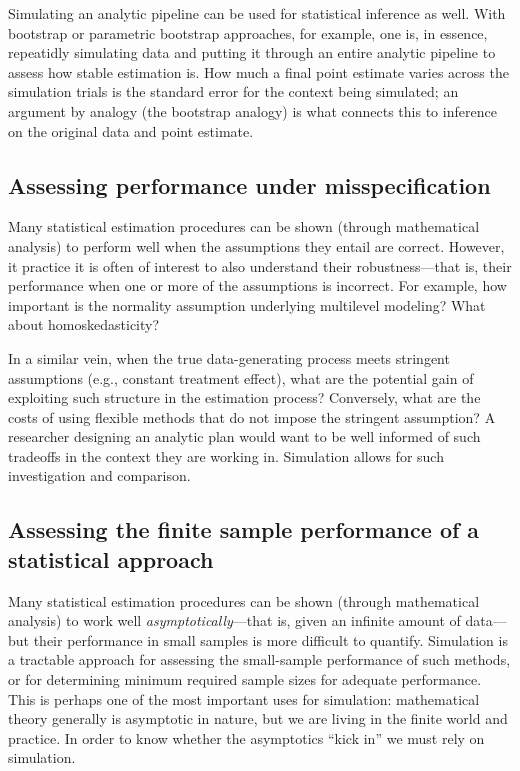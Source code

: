 \documentclass[
]{book}
\begin{document}
Simulating an analytic pipeline can be used for statistical inference as well.
With bootstrap or parametric bootstrap approaches, for example, one is, in essence, repeatidly simulating data and putting it through an entire analytic pipeline to assess how stable estimation is.
How much a final point estimate varies across the simulation trials is the standard error for the context being simulated; an argument by analogy (the bootstrap analogy) is what connects this to inference on the original data and point estimate.

\hypertarget{assessing-performance-under-misspecification}{%
\subsection{Assessing performance under misspecification}\label{assessing-performance-under-misspecification}}

Many statistical estimation procedures can be shown (through mathematical analysis) to perform well when the assumptions they entail are correct.
However, it practice it is often of interest to also understand their robustness---that is, their performance when one or more of the assumptions is incorrect.
For example, how important is the normality assumption underlying multilevel modeling?
What about homoskedasticity?

In a similar vein, when the true data-generating process meets stringent assumptions (e.g., constant treatment effect), what are the potential gain of exploiting such structure in the estimation process?
Conversely, what are the costs of using flexible methods that do not impose the stringent assumption?
A researcher designing an analytic plan would want to be well informed of such tradeoffs in the context they are working in.
Simulation allows for such investigation and comparison.

\hypertarget{assessing-the-finite-sample-performance-of-a-statistical-approach}{%
\subsection{Assessing the finite sample performance of a statistical approach}\label{assessing-the-finite-sample-performance-of-a-statistical-approach}}

Many statistical estimation procedures can be shown (through mathematical analysis) to work well \emph{asymptotically}---that is, given an infinite amount of data---but their performance in small samples is more difficult to quantify.
Simulation is a tractable approach for assessing the small-sample performance of such methods, or for determining minimum required sample sizes for adequate performance.
This is perhaps one of the most important uses for simulation: mathematical theory generally is asymptotic in nature, but we are living in the finite world and practice.
In order to know whether the asymptotics ``kick in'' we must rely on simulation.
\end{document}
